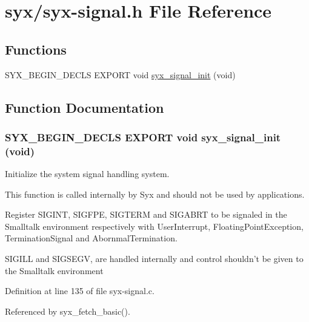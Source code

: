 \hypertarget{syx-signal_8h}{
\section{syx/syx-signal.h File Reference}
\label{syx-signal_8h}
}
\subsection*{Functions}
\begin{CompactItemize}
\item 
SYX\_\-BEGIN\_\-DECLS EXPORT void \hyperlink{syx-signal_8h_b462b271c25417787c0bf2d00a2c1e44}{syx\_\-signal\_\-init} (void)
\end{CompactItemize}


\subsection{Function Documentation}
\hypertarget{syx-signal_8h_b462b271c25417787c0bf2d00a2c1e44}{
\subsubsection{\setlength{\rightskip}{0pt plus 5cm}SYX\_\-BEGIN\_\-DECLS EXPORT void syx\_\-signal\_\-init (void)}}
\label{syx-signal_8h_b462b271c25417787c0bf2d00a2c1e44}


Initialize the system signal handling system.

This function is called internally by Syx and should not be used by applications.

Register SIGINT, SIGFPE, SIGTERM and SIGABRT to be signaled in the Smalltalk environment respectively with UserInterrupt, FloatingPointException, TerminationSignal and AbornmalTermination.

SIGILL and SIGSEGV, are handled internally and control shouldn't be given to the Smalltalk environment 

Definition at line 135 of file syx-signal.c.

Referenced by syx\_\-fetch\_\-basic().